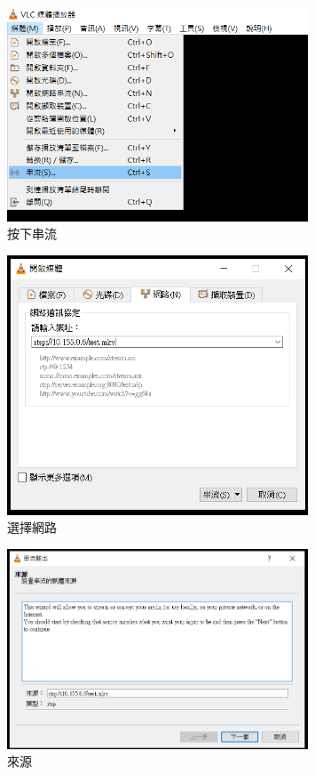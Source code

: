 \documentclass[10pt,UTF8]{ctexart}
\begin{document}
\begin{figure}[H]
\centering 
\includegraphics[width=0.80\textwidth]{7.png} 
\caption{按下串流}
\label{Test}
\end{figure}

\begin{figure}[H]
\centering 
\includegraphics[width=0.80\textwidth]{8.png} 
\caption{選擇網路}
\label{Test}
\end{figure}

\begin{figure}[H]
\centering 
\includegraphics[width=0.80\textwidth]{9.png} 
\caption{來源}
\label{Test}
\end{figure}
\end{document}
